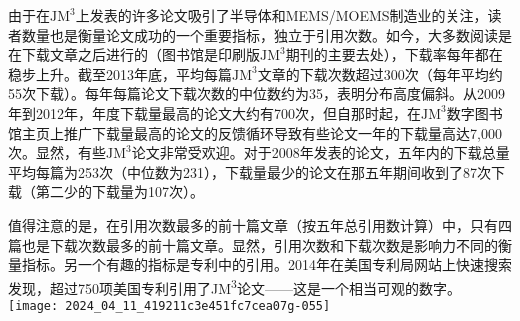 由于在$\mathrm{JM}^{3}$上发表的许多论文吸引了半导体和MEMS/MOEMS制造业的关注，读者数量也是衡量论文成功的一个重要指标，独立于引用次数。如今，大多数阅读是在下载文章之后进行的（图书馆是印刷版$\mathrm{JM}^{3}$期刊的主要去处），下载率每年都在稳步上升。截至2013年底，平均每篇$\mathrm{JM}^{3}$文章的下载次数超过300次（每年平均约55次下载）。每年每篇论文下载次数的中位数约为35，表明分布高度偏斜。从2009年到2012年，年度下载量最高的论文大约有700次，但自那时起，在$\mathrm{JM}^{3}$数字图书馆主页上推广下载量最高的论文的反馈循环导致有些论文一年的下载量高达7,000次。显然，有些$\mathrm{JM}^{3}$论文非常受欢迎。对于2008年发表的论文，五年内的下载总量平均每篇为253次（中位数为231），下载量最少的论文在那五年期间收到了87次下载（第二少的下载量为107次）。

值得注意的是，在引用次数最多的前十篇文章（按五年总引用数计算）中，只有四篇也是下载次数最多的前十篇文章。显然，引用次数和下载次数是影响力不同的衡量指标。另一个有趣的指标是专利中的引用。2014年在美国专利局网站上快速搜索发现，超过750项美国专利引用了JM\textsuperscript{3}论文——这是一个相当可观的数字。
\texttt{[image: 2024\_04\_11\_419211c3e451fc7cea07g-055]}

